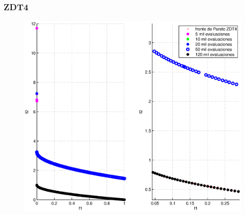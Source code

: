 \documentclass[10pt,compress]{beamer}
\begin{document}
\begin{frame}
	\frametitle{ZDT4}	
	\begin{figure}
      \begin{center}
	  \includegraphics[scale=0.45]{fontzdt4.eps}
      \end{center}      
      \end{figure}
\end{frame}
\end{document}
